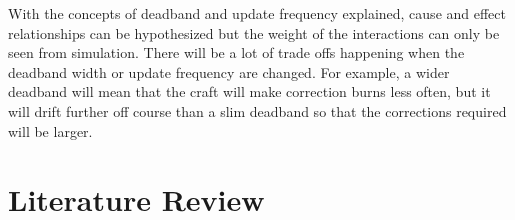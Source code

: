 \documentclass[journal, 10pt]{IEEEtran}
\begin{document}
With the concepts of deadband and update frequency explained, cause and effect relationships can be hypothesized but the weight of the interactions can only be seen from simulation.  There will be a lot of trade offs happening when the deadband width or update frequency are changed.  For example, a wider deadband will mean that the craft will make correction burns less often, but it will drift further off course than a slim deadband so that the corrections required will be larger.

%


\section{Literature Review}
\end{document}
